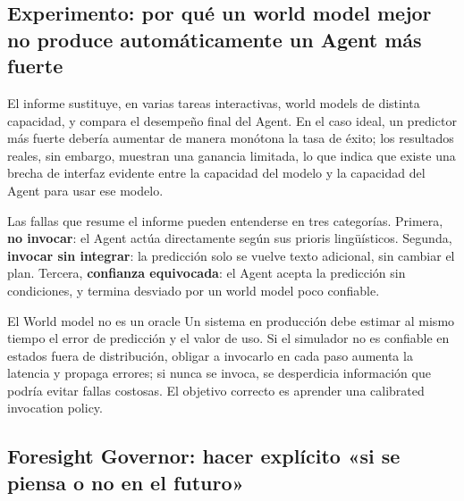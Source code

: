 \subsection{Experimento: por qué un world model mejor no produce automáticamente un Agent más fuerte}

El informe sustituye, en varias tareas interactivas, world models de distinta capacidad, y compara el desempeño final del Agent. En el caso ideal, un predictor más fuerte debería aumentar de manera monótona la tasa de éxito; los resultados reales, sin embargo, muestran una ganancia limitada, lo que indica que existe una brecha de interfaz evidente entre la capacidad del modelo y la capacidad del Agent para usar ese modelo.




Las fallas que resume el informe pueden entenderse en tres categorías. Primera, \textbf{no invocar}: el Agent actúa directamente según sus prioris lingüísticos. Segunda, \textbf{invocar sin integrar}: la predicción solo se vuelve texto adicional, sin cambiar el plan. Tercera, \textbf{confianza equivocada}: el Agent acepta la predicción sin condiciones, y termina desviado por un world model poco confiable.

\begin{warningbox}{El World model no es un oracle}
Un sistema en producción debe estimar al mismo tiempo el error de predicción y el valor de uso. Si el simulador no es confiable en estados fuera de distribución, obligar a invocarlo en cada paso aumenta la latencia y propaga errores; si nunca se invoca, se desperdicia información que podría evitar fallas costosas. El objetivo correcto es aprender una calibrated invocation policy.
\end{warningbox}

\subsection{Foresight Governor: hacer explícito «si se piensa o no en el futuro»}

